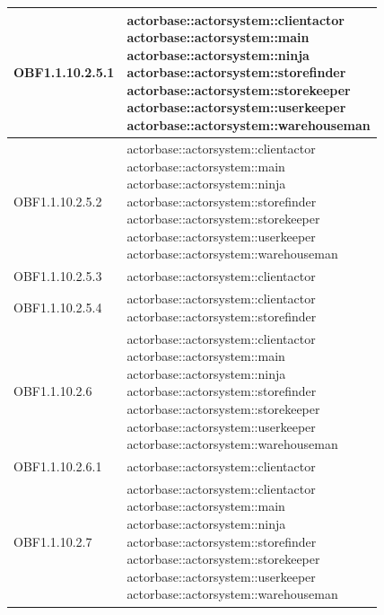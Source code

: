 \documentclass{scalatekids-article}
\begin{document}
\begin{longtable}[H]{|p{3.5cm}|p{7.5cm}|}
  \hline
  OBF1.1.10.2.5.1 & \multiLineCell[t]{actorbase::actorsystem::clientactor\\actorbase::actorsystem::main\\actorbase::actorsystem::ninja\\actorbase::actorsystem::storefinder\\actorbase::actorsystem::storekeeper\\actorbase::actorsystem::userkeeper\\actorbase::actorsystem::warehouseman\\}\\
  \hline
  OBF1.1.10.2.5.2 & \multiLineCell[t]{actorbase::actorsystem::clientactor\\actorbase::actorsystem::main\\actorbase::actorsystem::ninja\\actorbase::actorsystem::storefinder\\actorbase::actorsystem::storekeeper\\actorbase::actorsystem::userkeeper\\actorbase::actorsystem::warehouseman\\}\\
  \hline
  OBF1.1.10.2.5.3 & \multiLineCell[t]{actorbase::actorsystem::clientactor\\}\\
  \hline
  OBF1.1.10.2.5.4 & \multiLineCell[t]{actorbase::actorsystem::clientactor\\actorbase::actorsystem::storefinder\\}\\
  \hline
  OBF1.1.10.2.6 & \multiLineCell[t]{actorbase::actorsystem::clientactor\\actorbase::actorsystem::main\\actorbase::actorsystem::ninja\\actorbase::actorsystem::storefinder\\actorbase::actorsystem::storekeeper\\actorbase::actorsystem::userkeeper\\actorbase::actorsystem::warehouseman\\}\\
  \hline
  OBF1.1.10.2.6.1 & \multiLineCell[t]{actorbase::actorsystem::clientactor\\}\\
  \hline
  OBF1.1.10.2.7 & \multiLineCell[t]{actorbase::actorsystem::clientactor\\actorbase::actorsystem::main\\actorbase::actorsystem::ninja\\actorbase::actorsystem::storefinder\\actorbase::actorsystem::storekeeper\\actorbase::actorsystem::userkeeper\\actorbase::actorsystem::warehouseman\\}\\

\end{longtable}
\end{document}
